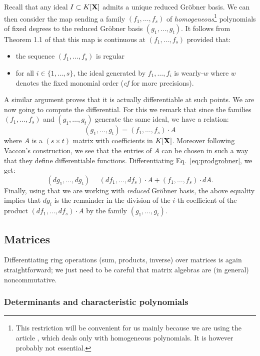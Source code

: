 \documentclass{lms}
\begin{document}
Recall that any 
ideal $I \subset K[\mathbf X]$ admits a unique reduced Gr\"obner basis. We can 
then consider the map sending a family $(f_1, \ldots, f_s)$ of 
\emph{homogeneous}\footnote{This restriction will be convenient for us 
mainly because we are using the article \cite{vaccon:14a}, which deals only 
with homogeneous polynomials. It is however probably not essential.} 
polynomials of fixed degrees to the reduced Gr\"obner basis $(g_1, 
\ldots, g_t)$. It follows from Theorem 1.1 of \cite{vaccon:14a} that this 
map is continuous at $(f_1, \ldots, f_s)$ provided that:
\begin{itemize}
\item the sequence $(f_1, \ldots, f_s)$ is regular
\item for all $i \in \{1, \ldots, s\}$, the ideal generated by
$f_1, \ldots, f_i$ is wearly-$w$ where $w$ denotes the fixed monomial
order (\emph{cf} \cite{vaccon:14a} for more precisions).
\end{itemize}
A similar argument proves that it is actually differentiable at such
points. We are now going to compute the differential. For this we
remark that since the families $(f_1, \ldots, f_s)$ and $(g_1, \ldots,
g_t)$ generate the same ideal, we have a relation:
\begin{equation}
\label{eq:prodgrobner}
(g_1, \ldots, g_t) = (f_1, \ldots, f_s) \cdot A
\end{equation}
where $A$ is a $(s \times t)$ matrix with coefficients in $K[\mathbf X]$.
Moreover following Vaccon's construction, we see that the entries of $A$ 
can be chosen in such a way that they define differentiable functions.
Differentiating Eq.~\eqref{eq:prodgrobner}, we get:
$$(d g_1, \ldots, d g_t) =
(d f_1, \ldots, d f_s) \cdot A + (f_1, \ldots, f_s) \cdot dA.$$
Finally, using that we are working with \emph{reduced} Gr\"obner
basis, the above equality implies that $d g_i$ is the remainder in
the division of the $i$-th coefficient of the product
$(d f_1, \ldots, d f_s) \cdot A$ by the family $(g_1, \ldots, g_t)$.

\subsection{Matrices}

Differentiating ring operations (sum, products, inverse) over matrices 
is again straightforward; we just need to be careful that matrix 
algebras are (in general) noncommutative.

\subsubsection*{Determinants and characteristic polynomials}
\end{document}
